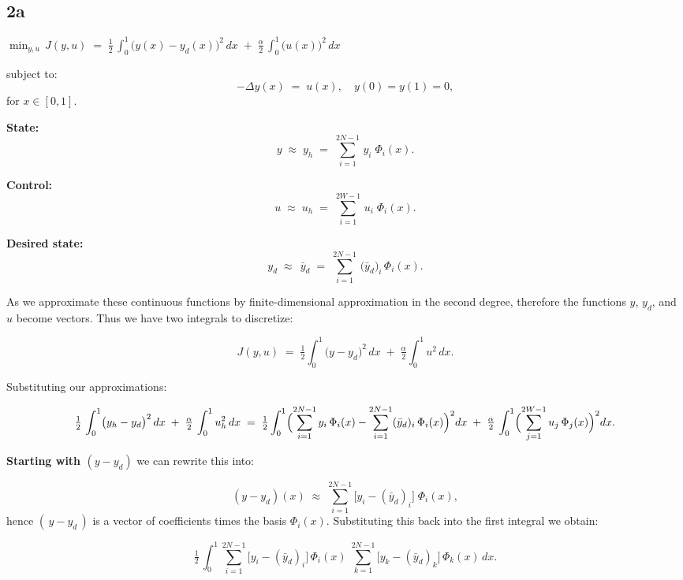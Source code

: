 \documentclass[a4paper,10pt]{article}
\begin{document}
\subsection{2a}

\noindent
$\displaystyle
\min_{y,u}\,J(y,u)
\;=\;
\tfrac12\,\int_{0}^{1}\bigl(y(x)-y_{d}(x)\bigr)^{2}\,dx
\;+\;\tfrac{\alpha}{2}\,\int_{0}^{1}\bigl(u(x)\bigr)^{2}\,dx
$

\noindent
subject to:
\[
-\Delta y(x)\;=\;u(x),\quad y(0)=y(1)=0,
\]
\noindent
for $x\in[0,1]$.

\bigskip

\noindent
\textbf{State:} 
\[
y \;\approx\; y_{h}
\;=\;
\sum_{i=1}^{2N-1}\,y_{i}\;\Phi_{i}(x).
\]

\noindent
\textbf{Control:} 
\[
u \;\approx\; u_{h}
\;=\;
\sum_{i=1}^{2W-1}\,u_{i}\;\Phi_{i}(x).
\]

\noindent
\textbf{Desired state:}
\[
y_{d}\;\approx\;\,\bar{y}_{d}
\;=\;
\sum_{i=1}^{2N-1}\,\bigl(\bar{y}_{d}\bigr)_{i}\,\Phi_{i}(x).
\]

\noindent
As we approximate these continuous functions by finite-dimensional approximation in the second degree,
therefore the functions $y$, $y_{d}$, and $u$ become vectors. Thus we have two integrals to discretize:

\[
J(y,u)
\;=\;
\tfrac12\int_{0}^{1}\bigl(y - y_{d}\bigr)^{2}\,dx
\;+\;
\tfrac{\alpha}{2}\int_{0}^{1}u^{2}\,dx.
\]

\noindent
Substituting our approximations:

\[
\tfrac12\,\int_{0}^{1}\bigl(y_{h}-y_{d}\bigr)^{2}\,dx
\;+\;
\tfrac{\alpha}{2}\,\int_{0}^{1}u_{h}^{2}\,dx
\;=\;
\tfrac12 \int_{0}^{1}
\Bigl(\sum_{i=1}^{2N-1}y_{i}\,\Phi_{i}(x)
-
\sum_{i=1}^{2N-1}(\bar{y}_{d})_{i}\,\Phi_{i}(x)\Bigr)^{2}
dx
\;+\;
\tfrac{\alpha}{2}\,\int_{0}^{1}
\Bigl(\sum_{j=1}^{2W-1}u_{j}\,\Phi_{j}(x)\Bigr)^{2}dx.
\]

\bigskip

\noindent
\textbf{Starting with $(y-y_{d})$} we can rewrite this into:

\[
(y - y_{d})(x)
\;\approx\;
\sum_{i=1}^{2N-1}\bigl[y_{i} - (\bar{y}_{d})_{i}\bigr]\;\Phi_{i}(x),
\]
hence $(\,y - y_{d}\,)$ is a vector of coefficients times the basis $\Phi_{i}(x)$. Substituting this back into
the first integral we obtain:

\[
\tfrac12\,\int_{0}^{1}
\sum_{i=1}^{2N-1}\bigl[y_{i} - (\bar{y}_{d})_{i}\bigr]\,\Phi_{i}(x)
\;\sum_{k=1}^{2N-1}\bigl[y_{k} - (\bar{y}_{d})_{k}\bigr]\,\Phi_{k}(x)\,dx.
\]
\end{document}
